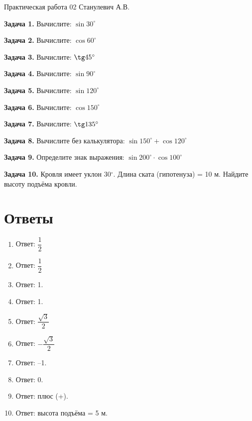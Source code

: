 \documentclass{umk-matematika}
\begin{document}
\maketitlepage
    {Практическая работа 02}
    {}
    {Станулевич А.В.}

\textbf{Задача 1.} Вычислите: $\sin 30^\circ$\par\vspace{10pt}
\textbf{Задача 2.} Вычислите: $\cos 60^\circ$\par\vspace{10pt}
\textbf{Задача 3.} Вычислите: $\tg 45^\circ$\par\vspace{10pt}
\textbf{Задача 4.} Вычислите: $\sin 90^\circ$\par\vspace{10pt}
\textbf{Задача 5.} Вычислите: $\sin 120^\circ$\par\vspace{10pt}
\textbf{Задача 6.} Вычислите: $\cos 150^\circ$\par\vspace{10pt}
\textbf{Задача 7.} Вычислите: $\tg 135^\circ$\par\vspace{10pt}
\textbf{Задача 8.} Вычислите без калькулятора: $\sin 150^\circ + \cos 120^\circ$\par\vspace{10pt}
\textbf{Задача 9.} Определите знак выражения: $\sin 200^\circ \cdot \cos 100^\circ$\par\vspace{10pt}
\textbf{Задача 10.} Кровля имеет уклон 30$^\circ$. Длина ската (гипотенуза) = 10 м. Найдите высоту подъёма кровли.\par\vspace{10pt}
\newpage
\section*{Ответы}

\begin{enumerate}
  \item Ответ: $\dfrac{1}{2}$
  \item Ответ: $\dfrac{1}{2}$
  \item Ответ: 1.
  \item Ответ: 1.
  \item Ответ: $\dfrac{\sqrt{3}}{2}$
  \item Ответ: $-\dfrac{\sqrt{3}}{2}$
  \item Ответ: –1.
  \item Ответ: 0.
  \item Ответ: плюс (+).
  \item Ответ: высота подъёма = 5 м.
\end{enumerate}
\end{document}
